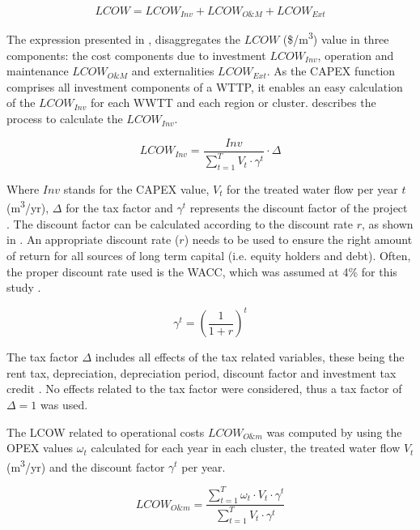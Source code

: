 \begin{equation}\label{eq:lcow}
LCOW = LCOW_{Inv} + LCOW_{O\&M} + LCOW_{Ext}
\end{equation}

The expression presented in , disaggregates the $LCOW$ (\$/m\textsuperscript{3}) value in three components: the cost components due to investment $LCOW_{Inv}$, operation and maintenance $LCOW_{O\&M}$ and externalities $LCOW_{Ext}$. As the CAPEX function comprises all investment components of a WTTP, it enables an easy calculation of the $LCOW_{Inv}$ for each WWTT and each region or cluster.  describes the process to calculate the $LCOW_{Inv}$.

\begin{equation}\label{eq:lcow_inv}
LCOW_{Inv} = \frac{Inv}{\sum_{t=1}^{T} V_{t}\cdot\gamma^{t}}\cdot\Delta
\end{equation}

Where $Inv$ stands for the CAPEX value, $V_{t}$ for the treated water flow per year $t$ (m\textsuperscript{3}/yr), $\Delta$ for the tax factor and $\gamma^{t}$ represents the discount factor of the project . The discount factor can be calculated according to the discount rate $r$, as shown in . An appropriate discount rate ($r$) needs to be used to ensure the right amount of return for all sources of long term capital (i.e. equity holders and debt). Often, the proper discount rate used is the WACC, which was assumed at 4\% for this study \cite{prospectscostcompetitive2013}. 

\begin{equation}\label{eq:gamma}
\gamma^{t} = \left(\frac{1}{1+r}\right)^{t}
\end{equation}

The tax factor $\Delta$ includes all effects of the tax related variables, these being the rent tax, depreciation, depreciation period, discount factor and investment tax credit \cite{prospectscostcompetitive2013}. No effects related to the tax factor were considered, thus a tax factor of $\Delta=1$ was used.

The LCOW related to operational costs $LCOW_{O\&m}$  was computed by using the OPEX values $\omega_{t}$ calculated for each year in each cluster, the treated water flow $V_{t}$ (m\textsuperscript{3}/yr) and the discount factor $\gamma^t$ per year.

\begin{equation}\label{eq:lcow_om}
LCOW_{O\&m} = \frac{\sum_{t=1}^{T} \omega_{t}\cdot V_{t}\cdot\gamma^{t}}{\sum_{t=1}^{T} V_{t}\cdot\gamma^{t}}
\end{equation}

